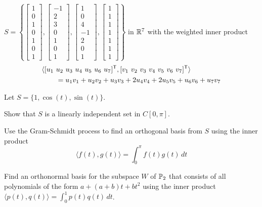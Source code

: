	\item $S = \left\{\left[ \begin{array}{c} 1\\0\\1\\0\\1\\0\\1 \end{array} \right], \left[ \begin{array}{r} -1\\2\\3\\0\\1\\0\\1 \end{array} \right], \left[ \begin{array}{r} 1\\0\\4\\-1\\2\\0\\1 \end{array} \right], \left[ \begin{array}{c} 1\\1\\1\\1\\1\\1\\1 \end{array} \right]\right\}$ in $\mathbb{R}^7$ with the weighted inner product 
\begin{align*}
 \langle [u_1 \ &u_2 \ u_3 \ u_4 \ u_5 \ u_6 \ u_7]^{\mathsf{T}}, [v_1 \ v_2 \ v_3 \ v_4 \ v_5 \ v_6 \ v_7]^{\mathsf{T}} \rangle \\
	&= u_1v_1 + u_2v_2 + u_3v_3 + 2u_4v_4 + 2u_5v_5 + u_6v_6 + u_7v_7
\end{align*}

	\ea

\item Let $S = \{1, \cos(t), \sin(t)\}$. 
	\ba
	\item Show that $S$ is a linearly independent set in $C[0,\pi]$.
	\item Use the Gram-Schmidt process to find an orthogonal basis from $S$ using the inner product 
	\[\langle f(t), g(t) \rangle = \int_{0}^{\pi} f(t) g(t) \, dt\]
	\ea

\item Find an orthonormal basis for the subspace $W$ of $\mathbb{P}_2$ that consists of all polynomials of the form $a + (a+b)t + bt^2$ using the inner product $\langle p(t), q(t) \rangle = \int_0^1 p(t)q(t) \, dt$. 

